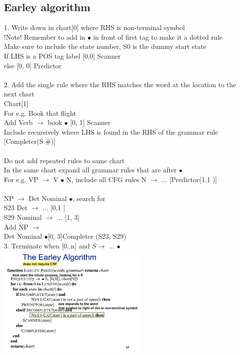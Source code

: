 \documentclass[11pt]{article}
\begin{document}
\begin{multicols*}{4}
\subsection*{Earley algorithm}
1. Write down in chart[0] where RHS is non-terminal symbol\\
!Note! Remember to add in $\bullet$ in front of first tag to make it a dotted rule\\
Make sure to include the state number, S0 is the dummy start state\\
If LHS is a POS tag label [0,0] Scanner\\
else [0, 0] Predictor
\\\\
2. Add the single rule where the RHS matches the word at the location to the next chart\\
Chart[1]\\
For e.g. Book that flight\\
	Add Verb $\rightarrow$ book $\bullet$ [0, 1] Scanner
\\
Include recursively where LHS is found in the RHS of the grammar rule [Completer(S \#)]
\\\\
Do not add repeated rules to same chart
\\
In the same chart expand all grammar rules that are after $\bullet$\\
For e.g. VP $\rightarrow$ V $\bullet$ N, include all CFG rules N $\rightarrow$ ... [Predictor(1,1 )]\\
\\
NP $\rightarrow$ Det Nominal $\bullet$, search for\\  S23 Det $\rightarrow$ ...  [0,1 ] 
\\ S29 Nominal $\rightarrow$ ... [1, 3]
\\
Add NP $\rightarrow$\\ Det Nominal $\bullet$[0, 3]Completer (S23, S29)
\\
3. Terminate when [0..n] and $S \rightarrow$ ... $\bullet $\\
\includegraphics[height=5.5cm]{images/w1_1}

\end{multicols*}
\end{document}

